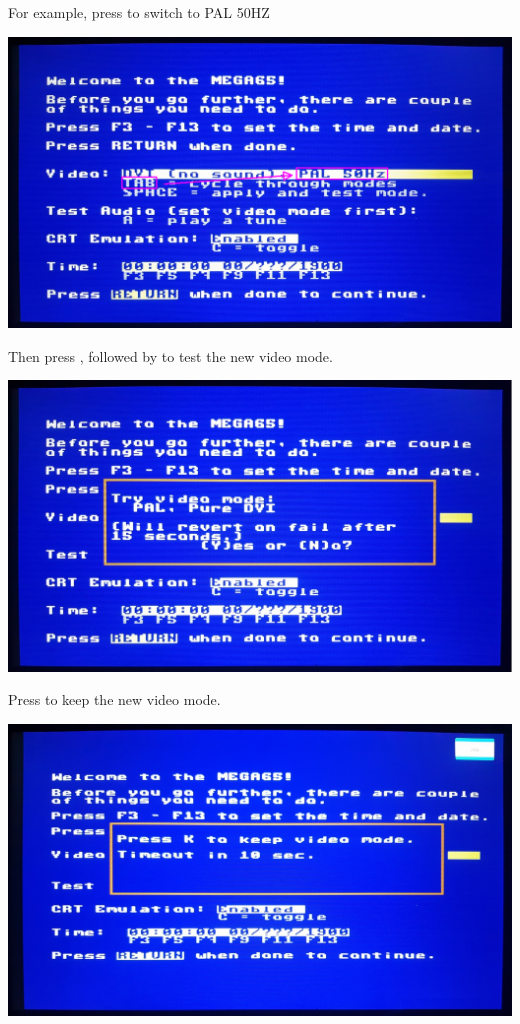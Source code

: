 For example, press  to switch to PAL 50HZ

\begin{center}
  \includegraphics[trim= 15mm 10mm 10mm 10mm,clip,width=0.7\linewidth]{images/img011_final_boot_02.png}
\end{center}

Then press  , followed by  to test the new video mode.

\begin{center}
  \includegraphics[trim= 15mm 10mm 10mm 15mm,clip,width=0.7\linewidth]{images/img011_final_boot_03.jpg}
\end{center}

Press  to keep the new video mode.

\begin{center}
  \includegraphics[trim= 20mm 20mm 10mm 25mm,clip,width=0.7\linewidth]{images/img011_final_boot_04.jpg}
\end{center}

